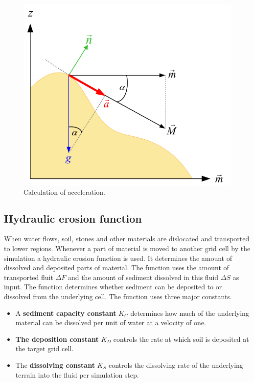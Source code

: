 \begin{figure}[htb]
	\centering
	\includegraphics[width=.8\linewidth]{NWD05/acceleration}
	\caption{Calculation of acceleration.}
	\label{fig:calc_acceleration}
\end{figure}

\subsection{Hydraulic erosion function}
When water flows, soil, stones and other materials are dislocated and transported to lower regions. Whenever a part of material is moved to another grid cell by the simulation a hydraulic erosion function is used. It determines the amount of dissolved and deposited parts of material. The function uses the amount of transported fluit $\Delta F$ and the amount of sediment dissolved in this fluid $\Delta S$ as input. The function determines whether sediment can be deposited to or dissolved from the underlying cell. The function uses three major constants. 
\begin{itemize}
\item A \textbf{sediment capacity constant} $K_C$ determines how much of the underlying material can be dissolved per unit of water at a velocity of one. 
\item \textbf{The deposition constant} $K_D$ controls the rate at which soil is deposited at the target grid cell. 
\item The \textbf{dissolving constant} $K_S$ controls the dissolving rate of the underlying terrain into the fluid per simulation step.
\end{itemize}


